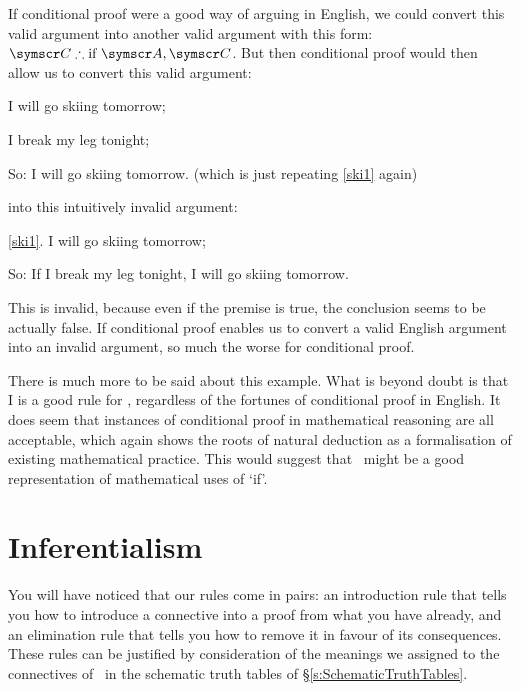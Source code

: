 If conditional proof were a good way of arguing in English, we could convert this valid argument into another valid argument with this form: $\meta{C} \ttherefore \text{if }\meta{A}, \meta{C}$. But then conditional proof would then allow us to convert this valid argument: \begin{earg}
	\item[\ex{ski1}] I will go skiing tomorrow;
	\item[\ex{ski2}] I break my leg tonight;
	\item[So:] I will go skiing tomorrow. \qquad(which is just repeating \ref{ski1} again)
\end{earg} into this intuitively invalid argument:
\begin{earg}
	\item[\ref{ski1}.] I will go skiing tomorrow;
	\item[So:] If I break my leg tonight, I will go skiing tomorrow.
\end{earg} This is invalid, because even if the premise is true, the conclusion seems to be actually false. If conditional proof enables us to convert a valid English argument into an invalid argument, so much the worse for conditional proof. 

There is much more to be said about this example. What is beyond doubt is that {\eif}I is a good rule for \TFL, regardless of the fortunes of conditional proof in English. It does seem that instances of conditional proof in mathematical reasoning are all acceptable, which again shows the roots of natural deduction as a formalisation of existing mathematical practice. This would suggest that \eif\ might be a good representation of mathematical uses of `if'.


\section{Inferentialism}\label{inferentialism}

You will have noticed that our rules come in pairs: an introduction rule that tells you how to introduce a connective into a proof from what you have already, and an elimination rule that tells you how to remove it in favour of its consequences. These rules can be justified by consideration of the meanings we assigned to the connectives of \TFL\ in the schematic truth tables of §\ref{s:SchematicTruthTables}.

